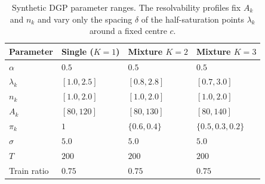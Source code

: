 \documentclass[11pt]{article}
\begin{document}
\begin{table}[ht]
\centering
\caption{Synthetic DGP parameter ranges. The resolvability profiles fix $A_k$ and $n_k$ and vary only the spacing $\delta$ of the half-saturation points $\lambda_k$ around a fixed centre $c$.}
\label{tab:dgp}
\begin{tabular}{llll}
\toprule
Parameter & Single ($K=1$) & Mixture $K=2$ & Mixture $K=3$ \\
\midrule
$\alpha$        & $0.5$                 & $0.5$                  & $0.5$                  \\
$\lambda_k$     & $[1.0, 2.5]$          & $[0.8, 2.8]$           & $[0.7, 3.0]$           \\
$n_k$           & $[1.0, 2.0]$          & $[1.0, 2.0]$           & $[1.0, 2.0]$           \\
$A_k$           & $[80, 120]$           & $[80, 130]$            & $[80, 140]$            \\
$\pi_k$         & $1$                   & $\{0.6, 0.4\}$         & $\{0.5, 0.3, 0.2\}$    \\
$\sigma$        & $5.0$                 & $5.0$                  & $5.0$                  \\
$T$             & $200$                 & $200$                  & $200$                  \\
Train ratio     & $0.75$                & $0.75$                 & $0.75$                 \\
\bottomrule
\end{tabular}
\end{table}
\end{document}
